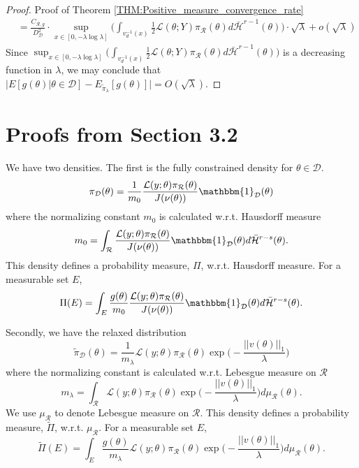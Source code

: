 \documentclass[10pt,fleqn]{article}
\DeclareMathOperator{\1}{\mathbbm{1}}
\begin{document}
{\begin{proof}{Proof of Theorem \ref{THM:Positive_measure_convergence_rate}}
\begin{align*}
&= \frac{C_{\mathcal{R},g}}{D_\mathcal{D}^2} \cdot \sup_{x \in [0,-\lambda\log\lambda]} \bigg( \int_{v_d^{-1}(x)} \frac{1}{2}\mathcal{L}(\theta;Y) \pi_\mathcal{R}(\theta) d\bar{\mathcal{H}}^{r-1}(\theta)\bigg)  \cdot \sqrt{\lambda} + o(\sqrt{\lambda})
\end{align*}
Since $\sup_{x \in [0,-\lambda\log\lambda]} \bigg( \int_{v_d^{-1}(x)} \frac{1}{2}\mathcal{L}(\theta;Y) \pi_\mathcal{R}(\theta) d\bar{\mathcal{H}}^{r-1}(\theta)\bigg)$ is a decreasing function in $\lambda$, we may conclude that $\big| E[g(\theta)|\theta\in\mathcal{D}]-E_{\tilde{\pi}_\lambda}[g(\theta)]\big| = O(\sqrt{\lambda}).$
\end{proof}

\section{Proofs from Section 3.2}
We have two densities. The first is the fully constrained density for $\theta\in\mathcal{D}$.
\begin{equation*}
\pi_\mathcal{D}(\theta) = \frac{1}{m_0} \frac{\mathcal{L}(y;\theta)\pi_\mathcal{R}(\theta)}{J(\nu(\theta))}\mathbbm{1}_\mathcal{D}(\theta)
\end{equation*}
where the normalizing constant $m_0$ is calculated w.r.t. Hausdorff measure
$$m_0 = \int_\mathcal{R} \frac{\mathcal{L}(y;\theta)\pi_\mathcal{R}(\theta)}{J(\nu(\theta))}\mathbbm{1}_\mathcal{D}(\theta)d\bar{\mathcal{H}}^{r-s}(\theta).$$
This density defines a probability measure, $\Pi$, w.r.t. Hausdorff measure.  For a measurable set $E$, 
$$\Pi(E) = \int_E \frac{g(\theta)}{m_0} \frac{\mathcal{L}(y;\theta)\pi_\mathcal{R}(\theta)}{J(\nu(\theta))}\mathbbm{1}_\mathcal{D}(\theta)d\bar{\mathcal{H}}^{r-s}(\theta).$$

Secondly, we have the relaxed distribution
$$\tilde{\pi}_\mathcal{D}(\theta) = \frac{1}{m_\lambda} \mathcal{L}(y;\theta)\pi_\mathcal{R}(\theta)\exp\bigg(-\frac{||v(\theta)||_1}{\lambda}\bigg)$$
where the normalizing constant is calculated w.r.t. Lebesgue measure on $\mathcal{R}$
$$m_\lambda = \int_\mathcal{R}\mathcal{L}(y;\theta)\pi_\mathcal{R}(\theta)\exp\bigg(-\frac{||v(\theta)||_1}{\lambda}\bigg) d\mu_\mathcal{R}(\theta).$$
We use $\mu_\mathcal{R}$ to denote Lebesgue measure on $\mathcal{R}.$ This density defines a probability measure, $\tilde{\Pi}$, w.r.t. $\mu_\mathcal{R}$.  For a measurable set $E$, 
$$\tilde{\Pi}(E) = \int_E \frac{g(\theta)}{m_\lambda} \mathcal{L}(y;\theta)\pi_\mathcal{R}(\theta)\exp\bigg(-\frac{||v(\theta)||_1}{\lambda}\bigg)d\mu_\mathcal{R}(\theta).$$

}
\end{document}
